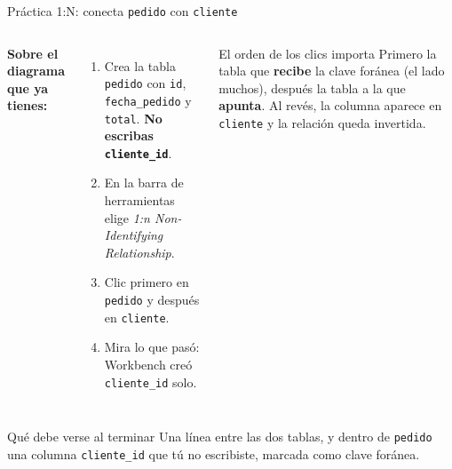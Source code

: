 \documentclass[aspectratio=169,10pt,c]{beamer}
\begin{document}
\begin{frame}{Práctica 1:N: conecta \texttt{pedido} con \texttt{cliente}}
\begin{columns}[T,onlytextwidth]
\small \textbf{Sobre el diagrama que ya tienes:}
\begin{enumerate}\setlength\itemsep{4pt}\small
  \item Crea la tabla \texttt{pedido} con \texttt{id}, \texttt{fecha\_pedido} y \texttt{total}. \textbf{No escribas \texttt{cliente\_id}}.
  \item En la barra de herramientas elige \textit{1:n Non-Identifying Relationship}.
  \item Clic primero en \texttt{pedido} y después en \texttt{cliente}.
  \item Mira lo que pasó: Workbench creó \texttt{cliente\_id} solo.
\end{enumerate}
\begin{alertblock}{El orden de los clics importa}
\small Primero la tabla que \textbf{recibe} la clave foránea (el lado muchos), después la tabla a la que \textbf{apunta}. Al revés, la columna aparece en \texttt{cliente} y la relación queda invertida.
\end{alertblock}
\end{columns}
\vspace{0.3cm}
\begin{exampleblock}{Qué debe verse al terminar}
\small Una línea entre las dos tablas, y dentro de \texttt{pedido} una columna \texttt{cliente\_id} que tú no escribiste, marcada como clave foránea.
\end{exampleblock}
\end{frame}
\end{document}
